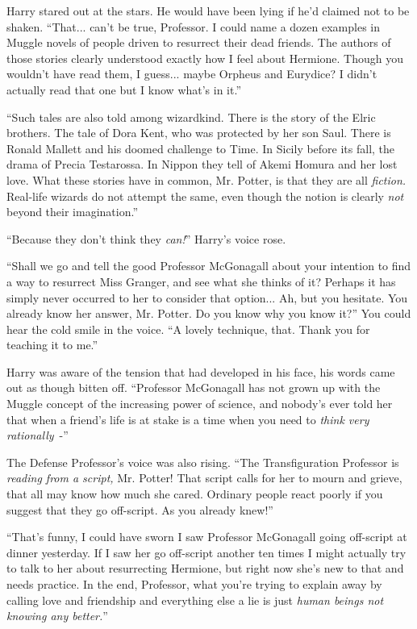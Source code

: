 Harry stared out at the stars. He would have been lying if he'd claimed not to be shaken. ``That... can't be true, Professor. I could name a dozen examples in Muggle novels of people driven to resurrect their dead friends. The authors of those stories clearly understood exactly how I feel about Hermione. Though you wouldn't have read them, I guess... maybe Orpheus and Eurydice? I didn't actually read that one but I know what's in it.''

``Such tales are also told among wizardkind. There is the story of the Elric brothers. The tale of Dora Kent, who was protected by her son Saul. There is Ronald Mallett and his doomed challenge to Time. In Sicily before its fall, the drama of Precia Testarossa. In Nippon they tell of Akemi Homura and her lost love. What these stories have in common, Mr. Potter, is that they are all \emph{fiction.} Real-life wizards do not attempt the same, even though the notion is clearly \emph{not} beyond their imagination.''

``Because they don't think they \emph{can!}'' Harry's voice rose.

``Shall we go and tell the good Professor McGonagall about your intention to find a way to resurrect Miss Granger, and see what she thinks of it? Perhaps it has simply never occurred to her to consider that option... Ah, but you hesitate. You already know her answer, Mr. Potter. Do you know why you know it?'' You could hear the cold smile in the voice. ``A lovely technique, that. Thank you for teaching it to me.''

Harry was aware of the tension that had developed in his face, his words came out as though bitten off. ``Professor McGonagall has not grown up with the Muggle concept of the increasing power of science, and nobody's ever told her that when a friend's life is at stake is a time when you need to \emph{think very rationally}~-''

The Defense Professor's voice was also rising. ``The Transfiguration Professor is \emph{reading from a script,} Mr. Potter! That script calls for her to mourn and grieve, that all may know how much she cared. Ordinary people react poorly if you suggest that they go off-script. As you already knew!''

``That's funny, I could have sworn I saw Professor McGonagall going off-script at dinner yesterday. If I saw her go off-script another ten times I might actually try to talk to her about resurrecting Hermione, but right now she's new to that and needs practice. In the end, Professor, what you're trying to explain away by calling love and friendship and everything else a lie is just \emph{human beings not knowing any better.}''

